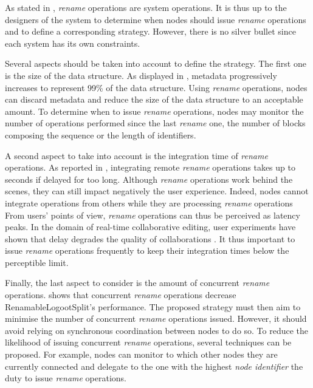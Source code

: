 \documentclass[10pt,journal,compsoc]{IEEEtran}
\begin{document}
As stated in , \emph{rename} operations are system operations.
It is thus up to the designers of the system to determine when nodes should issue \emph{rename} operations and to define a corresponding strategy.
However, there is no silver bullet since each system has its own constraints.

Several aspects should be taken into account to define the strategy.
The first one is the size of the data structure.
As displayed in , metadata progressively increases to represent 99\% of the data structure.
Using \emph{rename} operations, nodes can discard metadata and reduce the size of the data structure to an acceptable amount.
To determine when to issue \emph{rename} operations, nodes may monitor the number of operations performed since the last \emph{rename} one, the number of blocks composing the sequence or the length of identifiers.

A second aspect to take into account is the integration time of \emph{rename} operations.
As reported in , integrating remote \emph{rename} operations takes up to seconds if delayed for too long.
Although \emph{rename} operations work behind the scenes, they can still impact negatively the user experience.
Indeed, nodes cannot integrate operations from others while they are processing \emph{rename} operations
From users' points of view, \emph{rename} operations can thus be perceived as latency peaks.
In the domain of real-time collaborative editing, user experiments have shown that delay degrades the quality of collaborations \cite{ignat:hal-01088815,ignat:hal-01238831}.
It thus important to issue \emph{rename} operations frequently to keep their integration times below the perceptible limit.

Finally, the last aspect to consider is the amount of concurrent \emph{rename} operations.
 shows that concurrent \emph{rename} operations decrease RenamableLogootSplit's performance.
The proposed strategy must then aim to minimise the number of concurrent \emph{rename} operations issued.
However, it should avoid relying on synchronous coordination between nodes to do so.
To reduce the likelihood of issuing concurrent \emph{rename} operations, several techniques can be proposed.
For example, nodes can monitor to which other nodes they are currently connected and delegate to the one with the highest \emph{node identifier} the duty to issue \emph{rename} operations.
\end{document}
